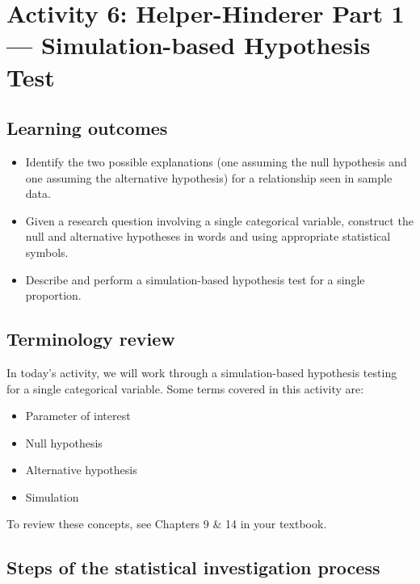 \documentclass[
]{report}
\begin{document}
\newpage

\section{Activity 6: Helper-Hinderer Part 1 --- Simulation-based Hypothesis Test}\label{activity-6-helper-hinderer-part-1-simulation-based-hypothesis-test}


\subsection{Learning outcomes}\label{learning-outcomes-5}

\begin{itemize}
\item
  Identify the two possible explanations (one assuming the null hypothesis and one assuming the alternative hypothesis) for a relationship seen in sample data.
\item
  Given a research question involving a single categorical variable, construct the null and alternative hypotheses
  in words and using appropriate statistical symbols.
\item
  Describe and perform a simulation-based hypothesis test for a single proportion.
\end{itemize}

\subsection{Terminology review}\label{terminology-review-5}

In today's activity, we will work through a simulation-based hypothesis testing for a single categorical variable. Some terms covered in this activity are:

\begin{itemize}
\item
  Parameter of interest
\item
  Null hypothesis
\item
  Alternative hypothesis
\item
  Simulation
\end{itemize}

To review these concepts, see Chapters 9 \& 14 in your textbook.

\subsection{Steps of the statistical investigation process}\label{steps-of-the-statistical-investigation-process-2}
\end{document}
